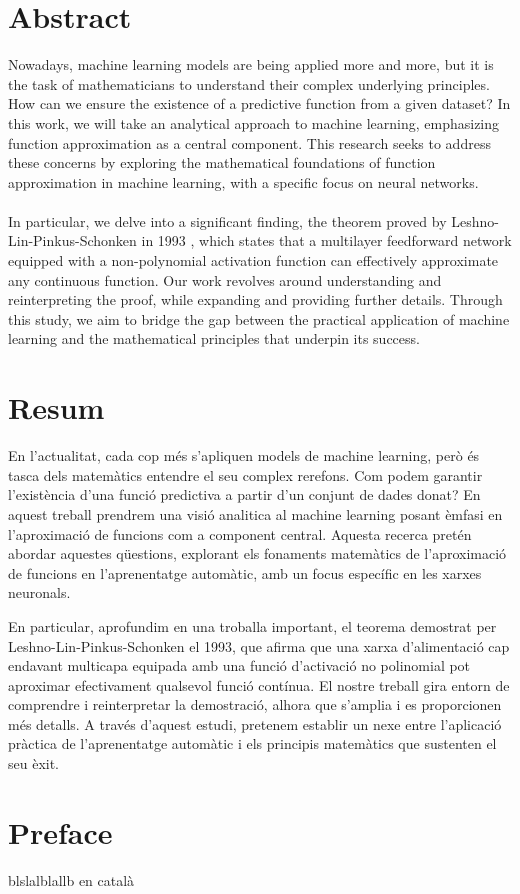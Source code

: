\documentclass[../../main.tex]{subfiles}
\begin{document}
\section*{Abstract} %


\noindent Nowadays, machine learning models are being applied more and more, but it is the task of mathematicians to understand their complex underlying principles. How can we ensure the existence of a predictive function from a given dataset? In this work, we will take an analytical approach to machine learning, emphasizing function approximation as a central component. This research seeks to address these concerns by exploring the mathematical foundations of function approximation in machine learning, with a specific focus on neural networks.
\\ \\
In particular, we delve into a significant finding, the theorem proved by Leshno-Lin-Pinkus-Schonken in 1993 \cite{leshno1993multilayer}, which states that a multilayer feedforward network equipped with a non-polynomial activation function can effectively approximate any continuous function. Our work revolves around understanding and reinterpreting the proof, while expanding and providing further details.
Through this study, we aim to bridge the gap between the practical application of machine learning and the mathematical principles that underpin its success.

\newpage

\section*{Resum}
En l'actualitat, cada cop més s'apliquen models de machine learning, però és tasca dels matemàtics entendre el seu complex rerefons. Com podem garantir l'existència d'una funció predictiva a partir d'un conjunt de dades donat?  En aquest treball prendrem una visió analitica al machine learning posant èmfasi en l'aproximació de funcions com a component central. Aquesta recerca pretén abordar aquestes qüestions, explorant els fonaments matemàtics de l'aproximació de funcions en l'aprenentatge automàtic, amb un focus específic en les xarxes neuronals.

En particular, aprofundim en una troballa important, el teorema demostrat per Leshno-Lin-Pinkus-Schonken el 1993, que afirma que una xarxa d'alimentació cap endavant multicapa equipada amb una funció d'activació no polinomial pot aproximar efectivament qualsevol funció contínua. El nostre treball gira entorn de comprendre i reinterpretar la demostració, alhora que s'amplia i es proporcionen més detalls.
A través d'aquest estudi, pretenem establir un nexe entre l'aplicació pràctica de l'aprenentatge automàtic i els principis matemàtics que sustenten el seu èxit.
\newpage
\section*{Preface}



blslalblallb en català
\end{document}
